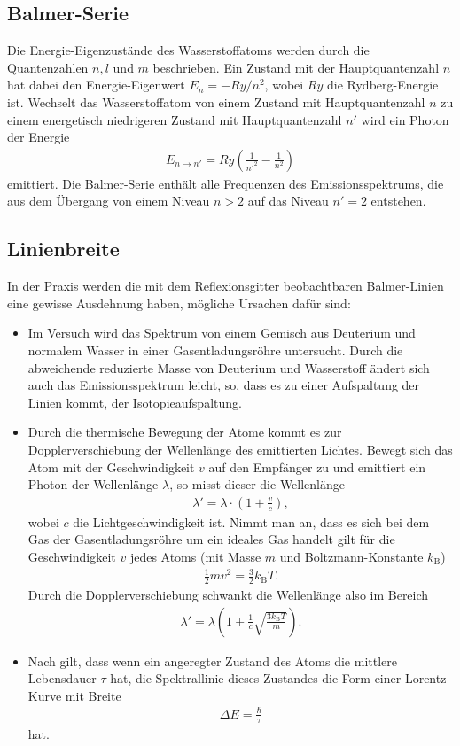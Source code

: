 \subsection{Balmer-Serie}
Die Energie-Eigenzustände des Wasserstoffatoms werden durch die Quantenzahlen $n,l$ und $m$ beschrieben. Ein Zustand mit der Hauptquantenzahl $n$ hat dabei den Energie-Eigenwert $E_n=-Ry/n^2$, wobei $Ry$ die Rydberg-Energie ist. Wechselt das Wasserstoffatom von einem Zustand mit Hauptquantenzahl $n$ zu einem energetisch niedrigeren Zustand mit Hauptquantenzahl $n'$ wird ein Photon der Energie 
\begin{align}
  E_{n \rightarrow n'}=Ry \left( \frac{1}{n'^2} - \frac{1}{n^2}\right)
\end{align}
emittiert. Die Balmer-Serie enthält alle Frequenzen des Emissionsspektrums, die aus dem Übergang von einem Niveau $n>2$ auf das Niveau $n'=2$ entstehen.

\subsection{Linienbreite}
In der Praxis werden die mit dem Reflexionsgitter beobachtbaren Balmer-Linien eine gewisse Ausdehnung haben, mögliche Ursachen dafür sind:
\begin{itemize}
\item
Im Versuch wird das Spektrum von einem Gemisch aus Deuterium und normalem Wasser in einer Gasentladungsröhre untersucht. Durch die abweichende reduzierte Masse von Deuterium und Wasserstoff ändert sich auch das Emissionsspektrum leicht, so, dass es zu einer Aufspaltung der Linien kommt, der Isotopieaufspaltung.
\item    
Durch die thermische Bewegung der Atome kommt es zur Dopplerverschiebung der Wellenlänge des emittierten Lichtes. Bewegt sich das Atom mit der Geschwindigkeit $v$ auf den Empfänger zu und emittiert ein Photon der Wellenlänge $\lambda$, so misst dieser die Wellenlänge 
\begin{align*}
  \lambda'=\lambda \cdot \left(  1+ \frac{v}{c} \right),
\end{align*} 
wobei $c$ die Lichtgeschwindigkeit ist. Nimmt man an, dass es sich bei dem Gas der Gasentladungsröhre um ein ideales Gas handelt gilt für die Geschwindigkeit $v$ jedes Atoms (mit Masse $m$ und Boltzmann-Konstante $k_\mathrm{B}$)
\begin{align*}
  \frac{1}{2} m v^2=\frac{3}{2} k_\mathrm{B} T.
\end{align*}
Durch die Dopplerverschiebung schwankt die Wellenlänge also im Bereich
\begin{align}
  \lambda'=\lambda\left(1 \pm \frac{1}{c}\sqrt{\frac{3k_\mathrm{B}T}{m}} \right).
\end{align}
\item
Nach \cite{unschaerfe} gilt, dass wenn ein angeregter Zustand des Atoms die mittlere Lebensdauer $\tau$ hat, die Spektrallinie dieses Zustandes die Form einer Lorentz-Kurve mit Breite 
\begin{align}
  \Delta E=\frac{\hbar}{\tau}
\end{align}
hat.
\end{itemize}